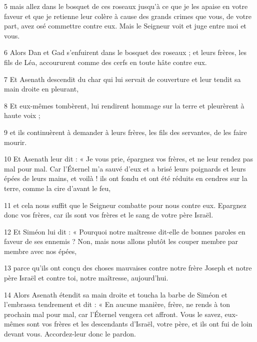 \par 5 mais allez dans le bosquet de ces roseaux jusqu'à ce que je les apaise en votre faveur et que je retienne leur colère à cause des grands crimes que vous, de votre part, avez osé commettre contre eux. Mais le Seigneur voit et juge entre moi et vous.

\par 6 Alors Dan et Gad s'enfuirent dans le bosquet des roseaux ; et leurs frères, les fils de Léa, accoururent comme des cerfs en toute hâte contre eux.

\par 7 Et Asenath descendit du char qui lui servait de couverture et leur tendit sa main droite en pleurant,

\par 8 Et eux-mêmes tombèrent, lui rendirent hommage sur la terre et pleurèrent à haute voix ;

\par 9 et ils continuèrent à demander à leurs frères, les fils des servantes, de les faire mourir.

\par 10 Et Asenath leur dit : « Je vous prie, épargnez vos frères, et ne leur rendez pas mal pour mal. Car l'Éternel m'a sauvé d'eux et a brisé leurs poignards et leurs épées de leurs mains, et voilà ! ils ont fondu et ont été réduits en cendres sur la terre, comme la cire d'avant le feu,

\par 11 et cela nous suffit que le Seigneur combatte pour nous contre eux. Epargnez donc vos frères, car ils sont vos frères et le sang de votre père Israël.

\par 12 Et Siméon lui dit : « Pourquoi notre maîtresse dit-elle de bonnes paroles en faveur de ses ennemis ? Non, mais nous allons plutôt les couper membre par membre avec nos épées,

\par 13 parce qu'ils ont conçu des choses mauvaises contre notre frère Joseph et notre père Israël et contre toi, notre maîtresse, aujourd'hui.

\par 14 Alors Asenath étendit sa main droite et toucha la barbe de Siméon et l'embrassa tendrement et dit : « En aucune manière, frère, ne rends à ton prochain mal pour mal, car l'Éternel vengera cet affront. Vous le savez, eux-mêmes sont vos frères et les descendants d'Israël, votre père, et ils ont fui de loin devant vous. Accordez-leur donc le pardon.

